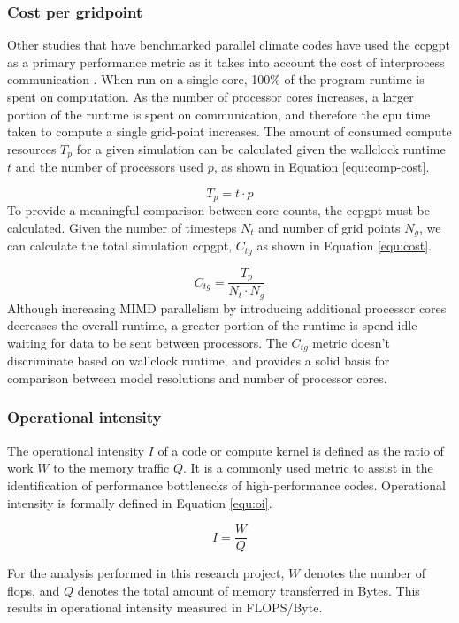 \documentclass[a4paper,11pt]{report}
\begin{document}
\subsubsection{Cost per gridpoint}
Other studies that have benchmarked parallel climate codes have used the \gls{ccpgpt} as a primary performance metric as it takes into account the cost of interprocess communication \cite{schmidt2007benchmark}. When run on a single core, 100\% of the program runtime is spent on computation. As the number of processor cores increases, a larger portion of the runtime is spent on communication, and therefore the cpu time taken to compute a single grid-point increases. The amount of consumed compute resources $T_p$ for a given simulation can be calculated given the wallclock runtime $t$ and the number of processors used $p$, as shown in Equation \ref{equ:comp-cost}.
\par
\begin{equation}
T_p = t \cdot p
\label{equ:comp-cost}
\end{equation}
To provide a meaningful comparison between core counts, the \gls{ccpgpt} must be calculated. Given the number of timesteps $N_t$ and number of grid points $N_g$, we can calculate the total simulation \gls{ccpgpt}, $C_{tg}$ as shown in Equation \ref{equ:cost}. 

\begin{equation}
C_{tg} = \frac{T_p}{N_t \cdot N_g}
\label{equ:cost}
\end{equation}
Although increasing MIMD parallelism by introducing additional processor cores decreases the overall runtime, a greater portion of the runtime is spend idle waiting for data to be sent between processors. The $C_{tg}$ metric doesn't discriminate based on wallclock runtime, and provides a solid basis for comparison between model resolutions and number of processor cores. 

\subsubsection{Operational intensity}
The operational intensity $I$ of a code or compute kernel is defined as the ratio of work $W$ to the memory traffic $Q$. It is a commonly used metric to assist in the identification of performance bottlenecks of high-performance codes. Operational intensity is formally defined in Equation \ref{equ:oi}.

\begin{equation}
\label{equ:oi}
I = \frac{W}{Q}
\end{equation}
\par
For the analysis performed in this research project, $W$ denotes the number of \gls{flops}, and $Q$ denotes the total amount of memory transferred in Bytes. This results in operational intensity measured in FLOPS/Byte. 
\end{document}
